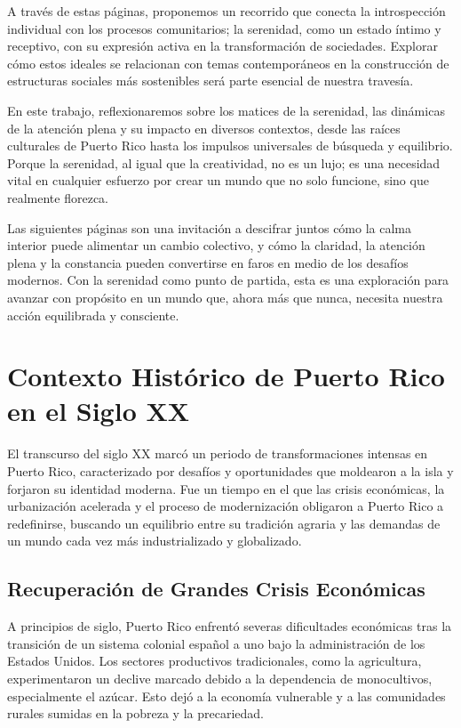 \documentclass[
]{book}
\begin{document}
A través de estas páginas, proponemos un recorrido que conecta la introspección individual con los procesos comunitarios; la serenidad, como un estado íntimo y receptivo, con su expresión activa en la transformación de sociedades. Explorar cómo estos ideales se relacionan con temas contemporáneos en la construcción de estructuras sociales más sostenibles será parte esencial de nuestra travesía.

En este trabajo, reflexionaremos sobre los matices de la serenidad, las dinámicas de la atención plena y su impacto en diversos contextos, desde las raíces culturales de Puerto Rico hasta los impulsos universales de búsqueda y equilibrio. Porque la serenidad, al igual que la creatividad, no es un lujo; es una necesidad vital en cualquier esfuerzo por crear un mundo que no solo funcione, sino que realmente florezca.

Las siguientes páginas son una invitación a descifrar juntos cómo la calma interior puede alimentar un cambio colectivo, y cómo la claridad, la atención plena y la constancia pueden convertirse en faros en medio de los desafíos modernos. Con la serenidad como punto de partida, esta es una exploración para avanzar con propósito en un mundo que, ahora más que nunca, necesita nuestra acción equilibrada y consciente.

\chapter{Contexto Histórico de Puerto Rico en el Siglo XX}\label{contexto-histuxf3rico-de-puerto-rico-en-el-siglo-xx}

El transcurso del siglo XX marcó un periodo de transformaciones intensas en Puerto Rico, caracterizado por desafíos y oportunidades que moldearon a la isla y forjaron su identidad moderna. Fue un tiempo en el que las crisis económicas, la urbanización acelerada y el proceso de modernización obligaron a Puerto Rico a redefinirse, buscando un equilibrio entre su tradición agraria y las demandas de un mundo cada vez más industrializado y globalizado.

\section{Recuperación de Grandes Crisis Económicas}\label{recuperaciuxf3n-de-grandes-crisis-econuxf3micas}

A principios de siglo, Puerto Rico enfrentó severas dificultades económicas tras la transición de un sistema colonial español a uno bajo la administración de los Estados Unidos. Los sectores productivos tradicionales, como la agricultura, experimentaron un declive marcado debido a la dependencia de monocultivos, especialmente el azúcar. Esto dejó a la economía vulnerable y a las comunidades rurales sumidas en la pobreza y la precariedad.
\end{document}
